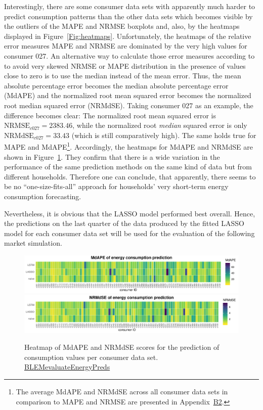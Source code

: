 Interestingly, there are some consumer data sets with apparently much harder to predict consumption patterns than the other data sets which becomes visible by the outliers of the MAPE and NRMSE boxplots and, also, by the heatmaps displayed in Figure~\ref{Fig:heatmaps}. Unfortunately, the heatmaps of the relative error measures MAPE and NRMSE are dominated by the very high values for consumer 027. An alternative way to calculate those error measures according to \citet{Hyndman:2006} to avoid very skewed NRMSE or MAPE distribution in the presence of values close to zero is to use the median instead of the mean error. Thus, the mean absolute percentage error becomes the median absolute percentage error (MdAPE) and the normalized root mean squared error becomes the normalized root median squared error (NRMdSE). Taking consumer 027 as an example, the difference becomes clear: The normalized root mean squared error is $\text{NRMSE}_{c027}=2383.46$, while the normalized root \emph{median} squared error is only $\text{NRMdSE}_{c027}=33.43$ (which is still comparatively high). The same holds true for MAPE and MdAPE\footnote{The average MdAPE and NRMdSE across all consumer data sets in comparison to MAPE and NRMSE are presented in Appendix~\hyperlink{AppB2:Tables:avg_errM_wMedian}{B2}.}. Accordingly, the heatmaps for MdAPE and NRMdSE are shown in Figure~\ref{Fig:heatmaps_median}. They confirm that there is a wide variation in the performance of the same prediction methods on the same kind of data but from different households. Therefore one can conclude, that apparently, there seems to be no ``one-size-fits-all'' approach for households' very short-term energy consumption forecasting.

Nevertheless, it is obvious that the LASSO model performed best overall. Hence, the predictions on the last quarter of the data produced by the fitted LASSO model for each consumer data set will be used for the evaluation of the following market simulation.
%
\begin{figure}[htbp]
 \centering
 \includegraphics[width=\textwidth]{thesis/graphs/evaluation/c_heatmap_MdAPE.pdf}
 \includegraphics[width=\textwidth]{thesis/graphs/evaluation/c_heatmap_NRMdSE.pdf}
\caption[Heatmaps of MdAPE and NRMdSE for consumption values]{Heatmap of MdAPE and NRMdSE scores for the prediction of consumption values per consumer data set. \quantnet\href{https://github.com/QuantLet/BLEM/tree/master/BLEMevaluateEnergyPreds}{BLEMevaluateEnergyPreds}}
\label{Fig:heatmaps_median}
\end{figure}
%



